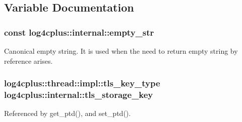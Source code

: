 \subsection{Variable Documentation}
\hypertarget{namespacelog4cplus_1_1internal_a0d0d7603bef53d5e6372aa980bf98f09}{
\subsubsection[{empty\-\_\-str}]{ const log4cplus\-::internal\-::empty\-\_\-str}}\label{namespacelog4cplus_1_1internal_a0d0d7603bef53d5e6372aa980bf98f09}
Canonical empty string. It is used when the need to return empty string by reference arises. \hypertarget{namespacelog4cplus_1_1internal_ab6ec06fb03085def321337d196460e1d}{
\subsubsection[{tls\-\_\-storage\-\_\-key}]{\setlength{\rightskip}{0pt plus 5cm}log4cplus\-::thread\-::impl\-::tls\-\_\-key\-\_\-type log4cplus\-::internal\-::tls\-\_\-storage\-\_\-key}}\label{namespacelog4cplus_1_1internal_ab6ec06fb03085def321337d196460e1d}


Referenced by get\-\_\-ptd(), and set\-\_\-ptd().

